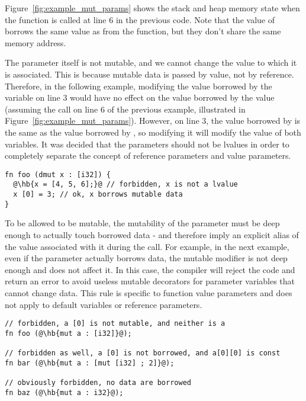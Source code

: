 Figure~\ref{fig:example_mut_params} shows the stack and heap memory state when
the  function is called at line 6 in the previous code. Note that
the value of  borrows the same value as  from the
 function, but they don't share the same memory address.



The parameter itself is not mutable, and we cannot change the value to which it
is associated. This is because mutable data is passed by value, not by
reference. Therefore, in the following example, modifying the value borrowed by
the variable  on line 3 would have no effect on the value borrowed by
the value  (assuming the call on line 6 of the previous example,
illustrated in Figure~\ref{fig:example_mut_params}). However, on line 3, the
value borrowed by  is the same as the value borrowed by , so
modifying it will modify the value of both variables. It was decided that the
parameters should not be lvalues in order to completely separate the concept of
reference parameters and value parameters.

\begin{lstlisting}[style=coloredverbatim, escapechar=@]
fn foo (dmut x : [i32]) {
  @\hb{x = [4, 5, 6];}@ // forbidden, x is not a lvalue
  x [0] = 3; // ok, x borrows mutable data
}
\end{lstlisting}

To be allowed to be mutable, the mutability of the parameter must be deep enough
to actually touch borrowed data - and therefore imply an explicit alias of the
value associated with it during the call. For example, in the next example, even
if the parameter actually borrows data, the mutable modifier is not deep enough
and does not affect it. In this case, the compiler will reject the code and
return an error to avoid useless mutable decorators for parameter variables that
cannot change data. This rule is specific to function value parameters and does
not apply to default variables or reference parameters.

\begin{lstlisting}[style=coloredverbatim, escapechar=@]
// forbidden, a [0] is not mutable, and neither is a
fn foo (@\hb{mut a : [i32]}@);

// forbidden as well, a [0] is not borrowed, and a[0][0] is const
fn bar (@\hb{mut a : [mut [i32] ; 2]}@);

// obviously forbidden, no data are borrowed
fn baz (@\hb{mut a : i32}@);
\end{lstlisting}

